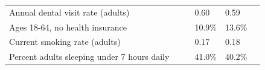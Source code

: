 \documentclass[9pt]{report}
\begin{document}
\begin{tabular}{p{.10in}p{.10in}p{.10in}p{3.7in}>{\hfill}p{.85in}>{\hfill}p{.85in}>{\hfill}p{.85in}>{\hfill}p{.85in}p{0.1in}}
\multicolumn{4}{l}{\parbox{3.6in}{\strut\raggedright{{Annual dental visit rate (adults)}}\strut}} &  &  & 0.60 & 0.59 & \multicolumn{1}{l}{}  \\ 
\multicolumn{4}{l}{\parbox{3.6in}{\strut\raggedright{{Ages 18-64, no health insurance}}\strut}} &  &  & 10.9\% & 13.6\% & \multicolumn{1}{l}{}  \\ 
\multicolumn{4}{l}{\parbox{3.6in}{\strut\raggedright{{Current smoking rate (adults)}}\strut}} &  &  & 0.17 & 0.18 & \multicolumn{1}{l}{}  \\ 
\multicolumn{4}{l}{\parbox{3.6in}{\strut\raggedright{{Percent adults sleeping under 7 hours daily}}\strut}} &  &  & 41.0\% & 40.2\% & \multicolumn{1}{l}{}  \\ 

\end{tabular}
\setlength{\tabcolsep}{6pt} %


\vspace{36pt}
\linespread{1.5}
\theendnotes
\end{document}
